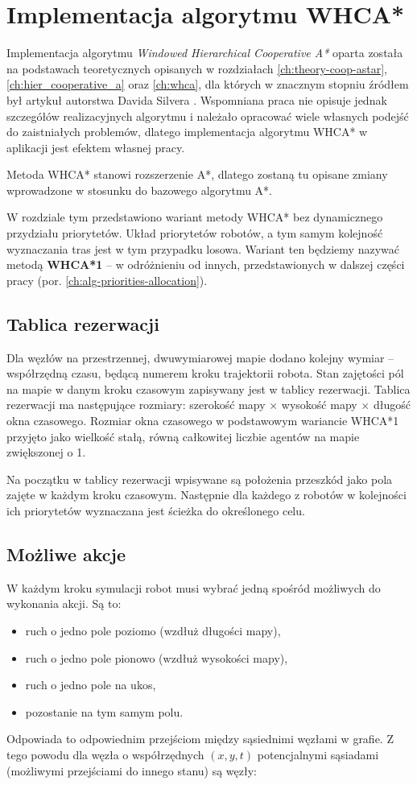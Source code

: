 \section{Implementacja algorytmu WHCA*}
\label{ch:alg-whca}

Implementacja algorytmu {\it  Windowed Hierarchical Cooperative A*} oparta została na podstawach teoretycznych opisanych w rozdziałach \ref{ch:theory-coop-astar}, \ref{ch:hier_cooperative_a} oraz \ref{ch:whca}, dla których w znacznym stopniu źródłem był artykuł autorstwa Davida Silvera \cite{cooppath}.
Wspomniana praca nie opisuje jednak szczegółów realizacyjnych algorytmu i należało opracować wiele własnych podejść do zaistniałych problemów, dlatego implementacja algorytmu WHCA* w aplikacji jest efektem własnej pracy.

Metoda WHCA* stanowi rozszerzenie A*, dlatego zostaną tu opisane zmiany wprowadzone w stosunku do bazowego algorytmu A*.

W rozdziale tym przedstawiono wariant metody WHCA* bez dynamicznego przydziału priorytetów.
Układ priorytetów robotów, a tym samym kolejność wyznaczania tras jest w tym przypadku losowa.
Wariant ten będziemy nazywać metodą {\bf WHCA*1} -- w odróżnieniu od innych, przedstawionych w dalszej części pracy (por. \ref{ch:alg-priorities-allocation}). 

\subsection{Tablica rezerwacji}
Dla węzłów na przestrzennej, dwuwymiarowej mapie dodano kolejny wymiar -- współrzędną czasu, będącą numerem kroku trajektorii robota.
Stan zajętości pól na mapie w danym kroku czasowym zapisywany jest w tablicy rezerwacji.
Tablica rezerwacji ma następujące rozmiary: szerokość mapy $\times$ wysokość mapy $\times$ długość okna czasowego.
Rozmiar okna czasowego w podstawowym wariancie WHCA*1 przyjęto jako wielkość stałą, równą całkowitej liczbie agentów na mapie zwiększonej o 1.

Na początku w tablicy rezerwacji wpisywane są położenia przeszkód jako pola zajęte w każdym kroku czasowym.
Następnie dla każdego z robotów w kolejności ich priorytetów wyznaczana jest ścieżka do określonego celu.

\subsection{Możliwe akcje}
W każdym kroku symulacji robot musi wybrać jedną spośród możliwych do wykonania akcji. Są to:
\begin{itemize}
	\item ruch o jedno pole poziomo (wzdłuż długości mapy),
	\item ruch o jedno pole pionowo (wzdłuż wysokości mapy),
	\item ruch o jedno pole na ukos,
	\item pozostanie na tym samym polu.
\end{itemize}
Odpowiada to odpowiednim przejściom między sąsiednimi węzłami w grafie.
Z tego powodu dla węzła o współrzędnych $(x, y, t)$ potencjalnymi sąsiadami (możliwymi przejściami do innego stanu) są węzły:

